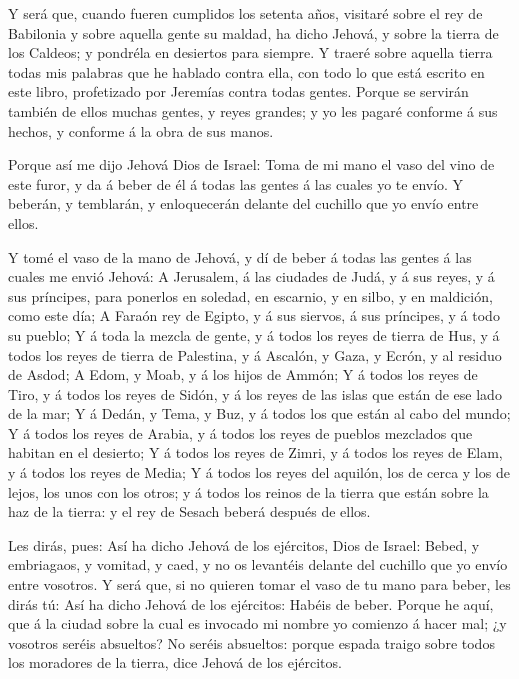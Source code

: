  Y será que, cuando fueren cumplidos los setenta años,
visitaré sobre el rey de Babilonia y sobre aquella gente su maldad, ha
dicho Jehová, y sobre la tierra de los Caldeos; y pondréla en desiertos
para siempre.  Y traeré sobre aquella tierra todas mis
palabras que he hablado contra ella, con todo lo que está escrito en
este libro, profetizado por Jeremías contra todas gentes. 
Porque se servirán también de ellos muchas gentes, y reyes grandes; y yo
les pagaré conforme á sus hechos, y conforme á la obra de sus manos.

 Porque así me dijo Jehová Dios de Israel: Toma de mi mano
el vaso del vino de este furor, y da á beber de él á todas las gentes á
las cuales yo te envío.  Y beberán, y temblarán, y
enloquecerán delante del cuchillo que yo envío entre ellos.

 Y tomé el vaso de la mano de Jehová, y dí de beber á todas
las gentes á las cuales me envió Jehová:  A Jerusalem, á
las ciudades de Judá, y á sus reyes, y á sus príncipes, para ponerlos en
soledad, en escarnio, y en silbo, y en maldición, como este día;
 A Faraón rey de Egipto, y á sus siervos, á sus príncipes,
y á todo su pueblo;  Y á toda la mezcla de gente, y á todos
los reyes de tierra de Hus, y á todos los reyes de tierra de Palestina,
y á Ascalón, y Gaza, y Ecrón, y al residuo de Asdod;  A
Edom, y Moab, y á los hijos de Ammón;  Y á todos los reyes
de Tiro, y á todos los reyes de Sidón, y á los reyes de las islas que
están de ese lado de la mar;  Y á Dedán, y Tema, y Buz, y á
todos los que están al cabo del mundo;  Y á todos los reyes
de Arabia, y á todos los reyes de pueblos mezclados que habitan en el
desierto;  Y á todos los reyes de Zimri, y á todos los
reyes de Elam, y á todos los reyes de Media;  Y á todos los
reyes del aquilón, los de cerca y los de lejos, los unos con los otros;
y á todos los reinos de la tierra que están sobre la haz de la tierra: y
el rey de Sesach beberá después de ellos.

 Les dirás, pues: Así ha dicho Jehová de los ejércitos,
Dios de Israel: Bebed, y embriagaos, y vomitad, y caed, y no os
levantéis delante del cuchillo que yo envío entre vosotros.
 Y será que, si no quieren tomar el vaso de tu mano para
beber, les dirás tú: Así ha dicho Jehová de los ejércitos: Habéis de
beber.  Porque he aquí, que á la ciudad sobre la cual es
invocado mi nombre yo comienzo á hacer mal; ¿y vosotros seréis
absueltos? No seréis absueltos: porque espada traigo sobre todos los
moradores de la tierra, dice Jehová de los ejércitos.

